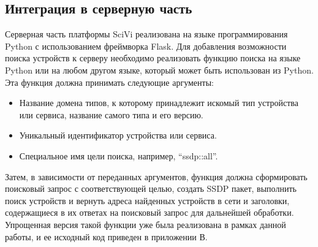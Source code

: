 \subsection{Интеграция в серверную часть}

Серверная часть платформы SciVi реализована на языке программирования Python с использованием фреймворка Flask.
Для добавления возможности поиска устройств к серверу необходимо реализовать функцию поиска на языке Python или на любом другом языке, который может быть использован из Python.
Эта функция должна принимать следующие аргументы:

\begin{itemize}
	\item Название домена типов, к которому принадлежит искомый тип устройства или сервиса, название самого типа и его версию.
	\item Уникальный идентификатор устройства или сервиса.
	\item Специальное имя цели поиска, например, "`ssdp::all"'.
\end{itemize}

Затем, в зависимости от переданных аргументов, функция должна сформировать поисковый запрос с соответствующей целью, создать SSDP пакет, выполнить поиск устройств и вернуть адреса найденных устройств в сети и заголовки, содержащиеся в их ответах на поисковый запрос для дальнейшей обработки.
Упрощенная версия такой функции уже была реализована в рамках данной работы, и ее исходный код приведен в приложении В.
